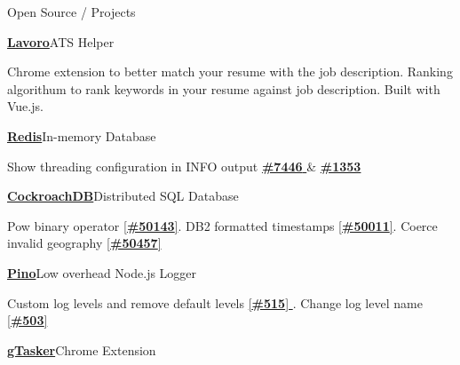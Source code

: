 \documentclass{resume}
\begin{document}
  \vspace{-0.5em}

  \begin{rSection}{Open Source / Projects}
    \begin{rProjectSection}{\href{https://chrome.google.com/webstore/detail/lavoro/apkdfigakniknjehnfaoopfhihahhnpp?hl=en&authuser=0}{\textbf{Lavoro}}}{ATS Helper}
      \item Chrome extension to better match your resume with the job description. Ranking algorithum to rank keywords in your resume against job description. Built with Vue.js.
    \end{rProjectSection}
    \vspace{-1em}
    \begin{rProjectSection}{\href{https://github.com/redis/redis}{\textbf{Redis}}}{In-memory Database}
      \item Show threading configuration in INFO output \href{https://github.com/redis/redis/pull/7446}{ \textbf{\#7446} } \& \href{https://github.com/redis/redis-doc/pull/1353}{\textbf{\#1353}}
    \end{rProjectSection}
    \vspace{-1em}
    \begin{rProjectSection}{\href{https://github.com/cockroachdb/cockroach}{\textbf {CockroachDB}}}{Distributed SQL Database}
      \item Pow binary operator \href{https://github.com/cockroachdb/cockroach/pull/50143}{[\textbf{\#50143}]}. DB2 formatted timestamps \href{https://github.com/cockroachdb/cockroach/pull/50011}{[\textbf{\#50011}]}. Coerce invalid geography \href{https://github.com/cockroachdb/cockroach/pull/50457}{[\textbf{\#50457}]}
    \end{rProjectSection}
    \vspace{-1em}
    \begin{rProjectSection}{\href{https://github.com/pinojs/pino}{\textbf{Pino}}}{Low overhead Node.js Logger}
      \item Custom log levels and remove default levels \href{https://github.com/pinojs/pino/pull/515}{ [\textbf{\#515}] }. Change log level name \href{https://github.com/pinojs/pino/pull/503}{ [\textbf{\#503}] }
    \end{rProjectSection}
    \vspace{-1em}
    \begin{rProjectSection}{\href{https://chrome.google.com/webstore/detail/gtasker-extension/lljekoepijafpdebkahcjdhbjaappami?hl=en-GB}{\textbf{gTasker}}}{Chrome Extension}

\end{rProjectSection}
\end{rSection}
\end{document}
